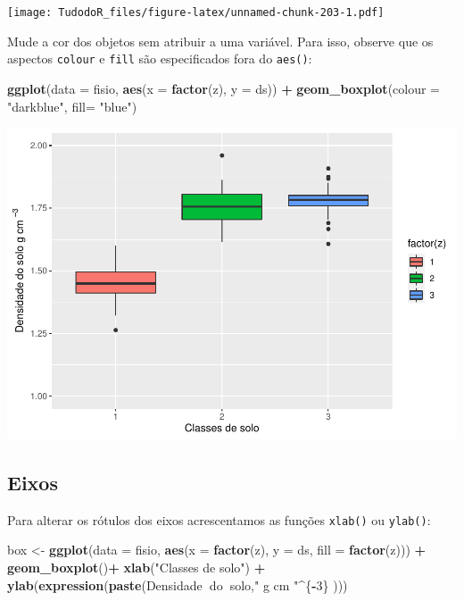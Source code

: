 \documentclass[
]{book}
\newenvironment{Shaded}{\begin{snugshade}}{\end{snugshade}}
\newcommand{\DataTypeTok}[1]{\textcolor[rgb]{0.13,0.29,0.53}{#1}}
\newcommand{\DecValTok}[1]{\textcolor[rgb]{0.00,0.00,0.81}{#1}}
\newcommand{\KeywordTok}[1]{\textcolor[rgb]{0.13,0.29,0.53}{\textbf{#1}}}
\newcommand{\NormalTok}[1]{#1}
\newcommand{\OperatorTok}[1]{\textcolor[rgb]{0.81,0.36,0.00}{\textbf{#1}}}
\newcommand{\StringTok}[1]{\textcolor[rgb]{0.31,0.60,0.02}{#1}}
\begin{document}
\texttt{[image: TudodoR\_files/figure-latex/unnamed-chunk-203-1.pdf]}

Mude a cor dos objetos sem atribuir a uma variável. Para isso, observe que os aspectos \texttt{colour} e \texttt{fill} são especificados fora do \texttt{aes()}:

\begin{Shaded}
\begin{Highlighting}[]
\KeywordTok{ggplot}\NormalTok{(}\DataTypeTok{data =}\NormalTok{ fisio, }\KeywordTok{aes}\NormalTok{(}\DataTypeTok{x =} \KeywordTok{factor}\NormalTok{(z), }\DataTypeTok{y =}\NormalTok{ ds)) }\OperatorTok{+}
\StringTok{  }\KeywordTok{geom_boxplot}\NormalTok{(}\DataTypeTok{colour =} \StringTok{"darkblue"}\NormalTok{, }\DataTypeTok{fill=} \StringTok{"blue"}\NormalTok{)}
\end{Highlighting}
\end{Shaded}

\includegraphics{TudodoR_files/figure-latex/unnamed-chunk-204-1.pdf}

\hypertarget{eixos}{%
\subsection{Eixos}\label{eixos}}

Para alterar os rótulos dos eixos acrescentamos as funções \texttt{xlab()} ou \texttt{ylab()}:

\begin{Shaded}
\begin{Highlighting}[]
\NormalTok{box <-}\StringTok{ }\KeywordTok{ggplot}\NormalTok{(}\DataTypeTok{data =}\NormalTok{ fisio, }\KeywordTok{aes}\NormalTok{(}\DataTypeTok{x =} \KeywordTok{factor}\NormalTok{(z), }\DataTypeTok{y =}\NormalTok{ ds, }\DataTypeTok{fill =} \KeywordTok{factor}\NormalTok{(z))) }\OperatorTok{+}
\StringTok{  }\KeywordTok{geom_boxplot}\NormalTok{()}\OperatorTok{+}
\StringTok{  }\KeywordTok{xlab}\NormalTok{(}\StringTok{"Classes de solo"}\NormalTok{) }\OperatorTok{+}
\StringTok{  }\KeywordTok{ylab}\NormalTok{(}\KeywordTok{expression}\NormalTok{(}\KeywordTok{paste}\NormalTok{(Densidade}\OperatorTok{~}\NormalTok{do}\OperatorTok{~}\NormalTok{solo,}\StringTok{" g cm "}\OperatorTok{^}\NormalTok{\{}\OperatorTok{-}\DecValTok{3}\NormalTok{\} )))}
\end{Highlighting}
\end{Shaded}
\end{document}
